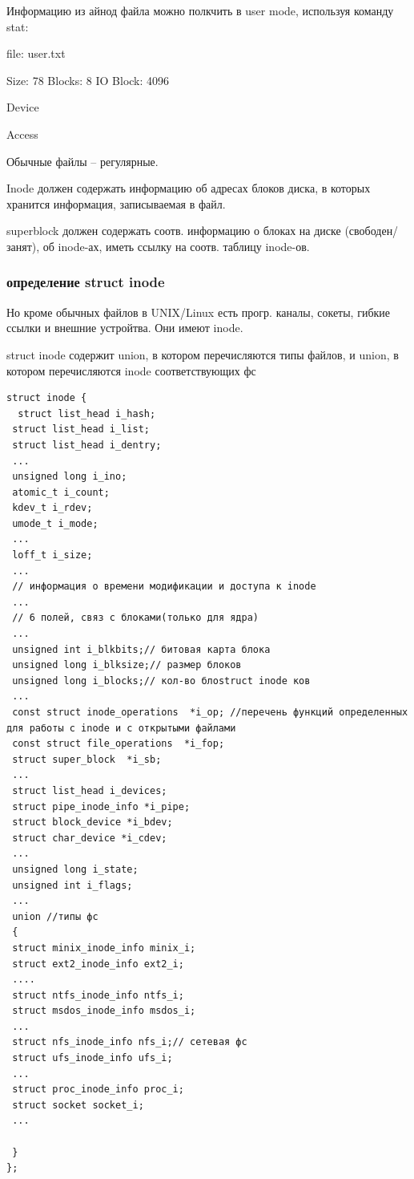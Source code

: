 Информацию из айнод файла можно полкчить в user mode, используя команду stat:

file: user.txt

Size: 78   Blocks: 8     IO Block: 4096

Device 

Access


Обычные файлы -- регулярные.

Inode должен содержать информацию об адресах блоков диска, в которых хранится информация, записываемая в файл.

superblock должен содержать соотв. информацию о блоках на диске (свободен/занят), об inode-ах, иметь ссылку на соотв. таблицу inode-ов.

\subsubsection{определение struct inode}

Но кроме обычных файлов в UNIX/Linux есть прогр. каналы, сокеты, гибкие ссылки и внешние устройтва. Они имеют inode.

struct inode содержит union, в котором перечисляются типы файлов, и union, в котором перечисляются inode соответствующих фс

\begin{lstlisting}
struct inode {
  struct list_head i_hash;
 struct list_head i_list;
 struct list_head i_dentry;
 ...
 unsigned long i_ino;
 atomic_t i_count;
 kdev_t i_rdev;
 umode_t i_mode;
 ...
 loff_t i_size;
 ...
 // информация о времени модификации и доступа к inode
 ...
 // 6 полей, связ с блоками(только для ядра)
 ...
 unsigned int i_blkbits;// битовая карта блока
 unsigned long i_blksize;// размер блоков
 unsigned long i_blocks;// кол-во блоstruct inode ков
 ...
 const struct inode_operations  *i_op; //перечень функций определенных для работы с inode и c открытыми файлами
 const struct file_operations  *i_fop; 
 struct super_block  *i_sb; 
 ...
 struct list_head i_devices;
 struct pipe_inode_info *i_pipe;
 struct block_device *i_bdev;
 struct char_device *i_cdev;
 ...
 unsigned long i_state;
 unsigned int i_flags;
 ...
 union //типы фс
 {
 struct minix_inode_info minix_i;
 struct ext2_inode_info ext2_i;
 ....
 struct ntfs_inode_info ntfs_i;
 struct msdos_inode_info msdos_i;
 ...
 struct nfs_inode_info nfs_i;// сетевая фс
 struct ufs_inode_info ufs_i;
 ...
 struct proc_inode_info proc_i;
 struct socket socket_i;
 ...
 
 }
};
\end{lstlisting}


